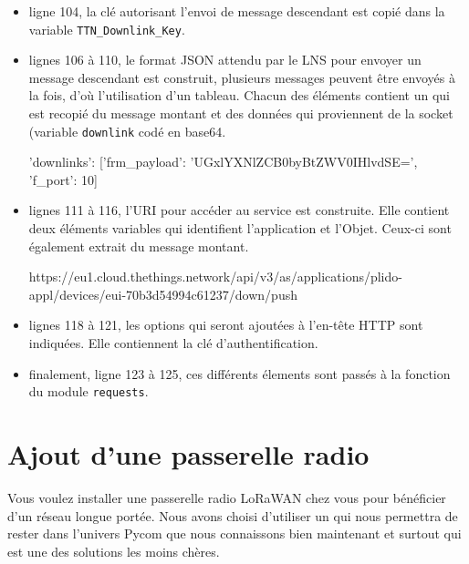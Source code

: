 \begin{itemize}
\item ligne 104, la clé autorisant l'envoi de message descendant est copié dans la variable \texttt{TTN\_Downlink\_Key}.
\item lignes 106 à 110, le format JSON attendu par le LNS pour envoyer un message descendant est construit, plusieurs messages peuvent être envoyés à la fois, d'où l'utilisation d'un tableau. Chacun des éléments contient un \texttt{} qui est recopié du message montant et des données qui proviennent de la socket (variable \texttt{downlink} codé en base64.

\begin{termc}[backgroundcolor=\color{palerod}, basicstyle=\ttfamily\tiny, escapechar=@]
{'downlinks': [{'frm_payload': 'UGxlYXNlZCB0byBtZWV0IHlvdSE=', 'f_port': 10}]}
\end{termc}
\item lignes 111 à 116, l'URI pour accéder au service est construite. Elle contient deux éléments variables qui identifient l'application et l'Objet. Ceux-ci sont également extrait du message montant.
\begin{termc}[backgroundcolor=\color{palerod}, basicstyle=\ttfamily\tiny, escapechar=@]
https://eu1.cloud.thethings.network/api/v3/as/applications/plido-appl/devices/eui-70b3d54994c61237/down/push
\end{termc}
\item lignes 118 à 121, les options qui seront ajoutées à l'en-tête HTTP sont indiquées. Elle contiennent la clé d'authentification.
\item finalement, ligne 123 à 125, ces différents élements sont passés à la fonction  du module \texttt{requests}.
\end{itemize}



\section{Ajout d'une passerelle radio}

\begin{figure}
\end{figure}




Vous voulez installer une passerelle radio LoRaWAN chez vous pour bénéficier d'un réseau longue portée. Nous avons choisi d'utiliser un  qui nous permettra de rester dans l'univers Pycom que nous connaissons bien maintenant et surtout qui est une des solutions les moins chères. 

